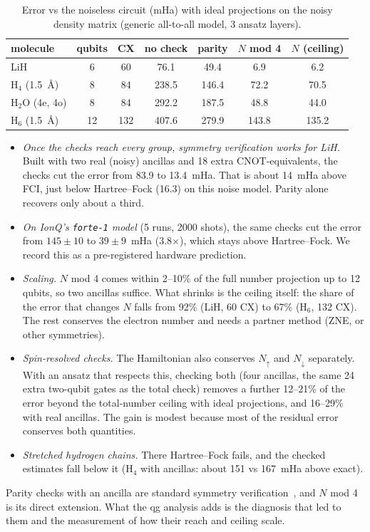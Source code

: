 \documentclass[11pt]{article}
\begin{document}
\begin{table}[t]
\centering\small
\caption{Error vs the noiseless circuit (mHa) with ideal projections on the noisy density matrix
(generic all-to-all model, 3 ansatz layers).}
\label{tab:rotated}
\begin{tabular}{lcccccc}
\toprule
molecule & qubits & CX & no check & parity & $N$ mod 4 & $N$ (ceiling)\\
\midrule
LiH & 6 & 60 & 76.1 & 49.4 & 6.9 & 6.2\\
H$_4$ (1.5~\AA) & 8 & 84 & 238.5 & 146.4 & 72.2 & 70.5\\
H$_2$O (4e, 4o) & 8 & 84 & 292.2 & 187.5 & 48.8 & 44.0\\
H$_6$ (1.5~\AA) & 12 & 132 & 407.6 & 279.9 & 143.8 & 135.2\\
\bottomrule
\end{tabular}
\end{table}

\begin{itemize}
\item \emph{Once the checks reach every group, symmetry verification works for LiH.} Built with two real
(noisy) ancillas and 18 extra CNOT-equivalents, the checks cut the error from 83.9 to 13.4~mHa. That is
about 14~mHa above FCI, just below Hartree--Fock (16.3) on this noise model. Parity alone recovers only
about a third.
\item \emph{On IonQ's \texttt{forte-1} model} (5 runs, 2000 shots), the same checks cut the error from
$145\pm10$ to $39\pm9$~mHa (3.8$\times$), which stays above Hartree--Fock. We record this as a
pre-registered hardware prediction.
\item \emph{Scaling.} $N$ mod 4 comes within 2--10\% of the full number projection up to 12 qubits, so
two ancillas suffice. What shrinks is the ceiling itself: the share of the error that changes $N$ falls
from 92\% (LiH, 60 CX) to 67\% (H$_6$, 132 CX). The rest conserves the electron number and needs a
partner method (ZNE, or other symmetries).
\item \emph{Spin-resolved checks.} The Hamiltonian also conserves $N_\uparrow$ and $N_\downarrow$ separately.
With an ansatz that respects this, checking both (four ancillas, the same 24 extra two-qubit gates as the
total check) removes a further 12--21\% of the error beyond the total-number ceiling with ideal
projections, and 16--29\% with real ancillas. The gain is modest because most of the residual error
conserves both quantities.
\item \emph{Stretched hydrogen chains.} There Hartree--Fock fails, and the checked estimates fall below
it (H$_4$ with ancillas: about 151 vs 167~mHa above exact).
\end{itemize}
Parity checks with an ancilla are standard symmetry verification~\cite{bonetmonroig2018}, and $N$ mod 4
is its direct extension. What the qg analysis adds is the diagnosis that led to them and the measurement
of how their reach and ceiling scale.
\end{document}
